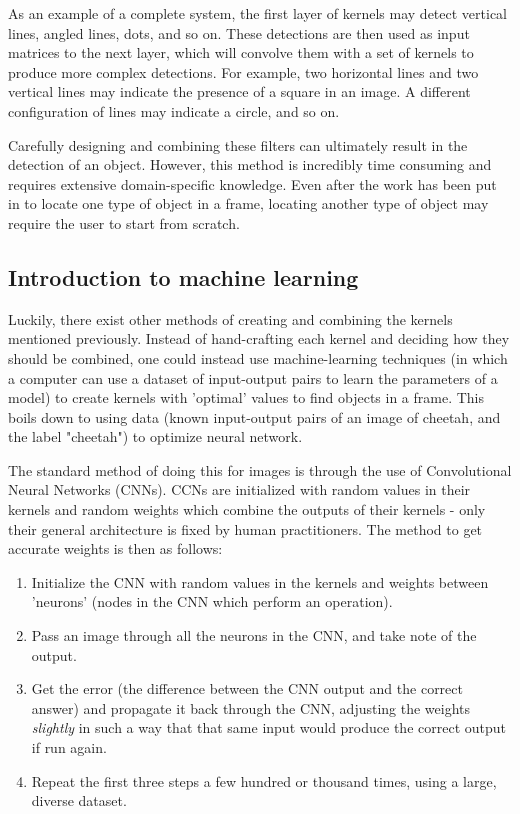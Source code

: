 As an example of a complete system, the first layer of kernels may detect vertical lines, angled lines, dots, and so on. These detections are then used as input matrices to the next layer, which will convolve them with a set of kernels to produce more complex detections. For example, two horizontal lines and two vertical lines may indicate the presence of a square in an image. A different configuration of lines may indicate a circle, and so on.

Carefully designing and combining these filters can ultimately result in the detection of an object. However, this method is incredibly time consuming and requires extensive domain-specific knowledge. Even after the work has been put in to locate one type of object in a frame, locating another type of object may require the user to start from scratch.

\subsection{Introduction to machine learning}

Luckily, there exist other methods of creating and combining the kernels mentioned previously. Instead of hand-crafting each kernel and deciding how they should be combined, one could instead use machine-learning techniques (in which a computer can use a dataset of input-output pairs to learn the parameters of a model) to create kernels with 'optimal' values to find objects in a frame. This boils down to using data (known input-output pairs of an image of cheetah, and the label "cheetah") to optimize neural network.

The standard method of doing this for images is through the use of Convolutional Neural Networks (CNNs). CCNs are initialized with random values in their kernels and random weights which combine the outputs of their kernels - only their general architecture is fixed by human practitioners. The method to get accurate weights is then as follows:

\begin{enumerate}
\item Initialize the CNN with random values in the kernels and weights between 'neurons' (nodes in the CNN which perform an operation).
\item Pass an image through all the neurons in the CNN, and take note of the output.
\item Get the error (the difference between the CNN output and the correct answer) and propagate it back through the CNN, adjusting the weights \emph{slightly} in such a way that that same input would produce the correct output if run again.
\item Repeat the first three steps a few hundred or thousand times, using a large, diverse dataset.
\end{enumerate}


